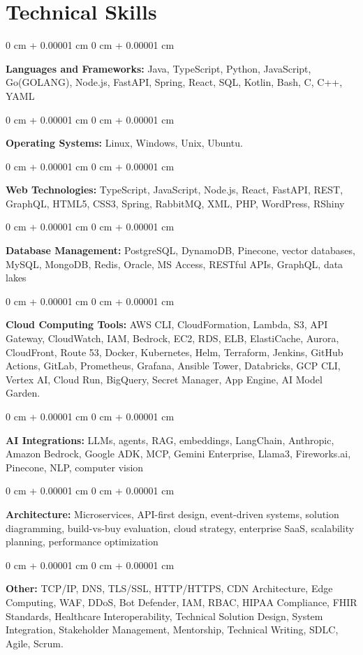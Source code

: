 \documentclass[10pt, letterpaper]{article}
\newenvironment{onecolentry}{
    \begin{adjustwidth}{
        0 cm + 0.00001 cm
    }{
        0 cm + 0.00001 cm
    }
}{
    \end{adjustwidth}
} %
\begin{document}
    \section{Technical Skills}
    \vspace{2 pt }
    \begin{onecolentry}
    \textbf{Languages and Frameworks:} Java, TypeScript, Python, JavaScript, Go(GOLANG), Node.js, FastAPI, Spring, React, SQL, Kotlin, Bash, C, C++, YAML
    \end{onecolentry}
    \begin{onecolentry}
        \textbf{Operating Systems:} Linux, Windows, Unix, Ubuntu.
    \end{onecolentry}
    \begin{onecolentry}
         \textbf{Web Technologies:} TypeScript, JavaScript, Node.js, React, FastAPI, REST, GraphQL, HTML5, CSS3, Spring, RabbitMQ, XML, PHP, WordPress, RShiny \end{onecolentry}
    \begin{onecolentry}
        \textbf{Database Management:} PostgreSQL, DynamoDB, Pinecone, vector databases, MySQL, MongoDB, Redis, Oracle, MS Access, RESTful APIs, GraphQL, data lakes \end{onecolentry}
    \begin{onecolentry}
        \textbf{Cloud Computing Tools:}
AWS CLI, CloudFormation, Lambda, S3, API Gateway, CloudWatch, IAM, Bedrock, EC2, RDS, ELB, ElastiCache, Aurora, CloudFront, Route 53, Docker, Kubernetes, Helm, Terraform, Jenkins, GitHub Actions, GitLab, Prometheus, Grafana, Ansible Tower, Databricks, GCP CLI, Vertex AI, Cloud Run, BigQuery, Secret Manager, App Engine, AI Model Garden.
    \end{onecolentry}
    \begin{onecolentry}
         \textbf{AI Integrations:} LLMs, agents, RAG, embeddings, LangChain, Anthropic, Amazon Bedrock, Google ADK, MCP, Gemini Enterprise, Llama3, Fireworks.ai, Pinecone, NLP, computer vision \end{onecolentry}
    \begin{onecolentry}
        \textbf{Architecture:} Microservices, API-first design, event-driven systems, solution diagramming, build-vs-buy evaluation, cloud strategy, enterprise SaaS, scalability planning, performance optimization \end{onecolentry}
        \begin{onecolentry}
     \textbf{Other:} TCP/IP, DNS, TLS/SSL, HTTP/HTTPS, CDN Architecture, Edge Computing, WAF, DDoS, Bot Defender, IAM, RBAC, HIPAA Compliance, FHIR Standards, Healthcare Interoperability, Technical Solution Design, System Integration, Stakeholder Management, Mentorship, Technical Writing, SDLC, Agile, Scrum.
    \end{onecolentry}
\end{document}

